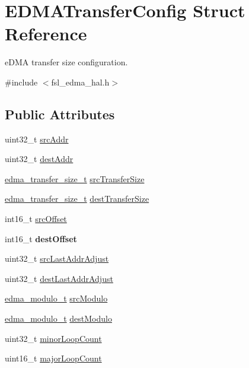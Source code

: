 \hypertarget{structEDMATransferConfig}{}\section{E\+D\+M\+A\+Transfer\+Config Struct Reference}
\label{structEDMATransferConfig}


e\+D\+MA transfer size configuration.  




{\ttfamily \#include $<$fsl\+\_\+edma\+\_\+hal.\+h$>$}

\subsection*{Public Attributes}
\begin{DoxyCompactItemize}
\item 
uint32\+\_\+t \hyperlink{structEDMATransferConfig_aa4084947679d144000e702caf60a4b5a}{src\+Addr}
\item 
uint32\+\_\+t \hyperlink{structEDMATransferConfig_a78d3fa690232475c3a21b1c8b84761d2}{dest\+Addr}
\item 
\hyperlink{group__edma__hal_ga3cd26ca8831986959f668621f2e52d32}{edma\+\_\+transfer\+\_\+size\+\_\+t} \hyperlink{structEDMATransferConfig_a6d0b69a4f58895eeaeaaec447c4fae23}{src\+Transfer\+Size}
\item 
\hyperlink{group__edma__hal_ga3cd26ca8831986959f668621f2e52d32}{edma\+\_\+transfer\+\_\+size\+\_\+t} \hyperlink{structEDMATransferConfig_a69a61bee8a0b47271644a9f9162d9170}{dest\+Transfer\+Size}
\item 
int16\+\_\+t \hyperlink{structEDMATransferConfig_a0fa681434c8a95d906b11ac74798b268}{src\+Offset}
\item 
int16\+\_\+t {\bfseries dest\+Offset}\hypertarget{structEDMATransferConfig_af0d09a0a3b482b4ef5075d206779893d}{}\label{structEDMATransferConfig_af0d09a0a3b482b4ef5075d206779893d}

\item 
uint32\+\_\+t \hyperlink{structEDMATransferConfig_a24aab8f4483f2cb5b1a0583072a860a1}{src\+Last\+Addr\+Adjust}
\item 
uint32\+\_\+t \hyperlink{structEDMATransferConfig_afe235925c12cfd39b89e5b73308c87c1}{dest\+Last\+Addr\+Adjust}
\item 
\hyperlink{group__edma__hal_ga567f4aba444f1fb55ac796ea3c12b1f6}{edma\+\_\+modulo\+\_\+t} \hyperlink{structEDMATransferConfig_a1458ad1e6c16ab87b54947399c1e4f67}{src\+Modulo}
\item 
\hyperlink{group__edma__hal_ga567f4aba444f1fb55ac796ea3c12b1f6}{edma\+\_\+modulo\+\_\+t} \hyperlink{structEDMATransferConfig_a0941f5eab0cb5e32c47959a38cbdeef8}{dest\+Modulo}
\item 
uint32\+\_\+t \hyperlink{structEDMATransferConfig_a749e1b8c1fdbf19e849141670ca3c3d2}{minor\+Loop\+Count}
\item 
uint16\+\_\+t \hyperlink{structEDMATransferConfig_aab33d5809b66064e4808662db93d260b}{major\+Loop\+Count}
\end{DoxyCompactItemize}


